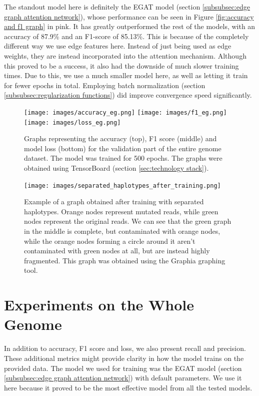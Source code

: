 \documentclass[times, utf8, diplomski, english]{fer_eng}
\begin{document}
The standout model here is definitely the EGAT model (section \ref{subsubsec:edge graph attention network}), whose performance can be seen in Figure \ref{fig:accuracy and f1 graph} in pink. It has greatly outperformed the rest of the models, with an accuracy of 87.9\% and an F1-score of 85.13\%. This is because of the completely different way we use edge features here. Instead of just being used as edge weights, they are instead incorporated into the attention mechanism. Although this proved to be a success, it also had the downside of much slower training times. Due to this, we use a much smaller model here, as well as letting it train for fewer epochs in total. Employing batch normalization (section \ref{subsubsec:regularization functions}) did improve convergence speed significantly.

\begin{figure}
	\centering
	\texttt{[image: images/accuracy\_eg.png]}
	\texttt{[image: images/f1\_eg.png]}
	\texttt{[image: images/loss\_eg.png]}
	\caption[Accuracy,f1 score and loss graph]{Graphs representing the accuracy (top), F1 score (middle) and model loss (bottom) for the validation part of the entire genome dataset. The model was trained for 500 epochs. The graphs were obtained using TensorBoard (section \ref{sec:technology stack}).}
	\label{fig:accuracy, f1 score and loss}
\end{figure}

\begin{figure}
	\centering
	\texttt{[image: images/separated\_haplotypes\_after\_training.png]}
	\caption[Separated graph after training]{Example of a graph obtained after training with separated haplotypes. Orange nodes represent mutated reads, while green nodes represent the original reads. We can see that the green graph in the middle is complete, but contaminated with orange nodes, while the orange nodes forming a circle around it aren't contaminated with green nodes at all, but are instead highly fragmented. This graph was obtained using the Graphia\footnotemark{} graphing tool.}
	\label{fig:separated graph after training}
\end{figure}

\section{Experiments on the Whole Genome}
\label{sec:experiments on the whole genome}

In addition to accuracy, F1 score and loss, we also present recall and precision. These additional metrics might provide clarity in how the model trains on the provided data. The model we used for training was the EGAT model (section \ref{subsubsec:edge graph attention network}) with default parameters. We use it here because it proved to be the most effective model from all the tested models.
\end{document}

